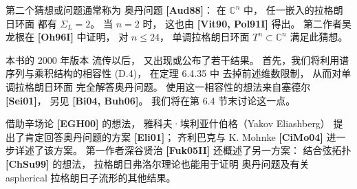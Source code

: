 第二个猜想或问题通常称为
奥丹问题
\textbf{[Aud88]}：
在 $\mathbb C^n$ 中，
任一嵌入的拉格朗日环面
都有 $\Sigma_L=2$。
当 $n=2$ 时，
这也由 \textbf{[Vit90, Pol91I]} 得出。
第二作者吴龙根在
\textbf{[Oh96I]} 中证明，
对 $n\le24$，
单调拉格朗日环面
$T^n\subset\mathbb C^n$
满足此猜想。

本书的 2000 年版本
流传以后，
又出现或公布了若干结果。
首先，我们将利用谱序列与乘积结构的相容性
\textup{(D.4)}，
在定理 6.4.35 中
去掉前述维数限制，
从而对单调拉格朗日环面
完全解答奥丹问题。
使用这一相容性的想法来自塞德尔
\textbf{[Sei01]}，
另见 \textbf{[Bi04, Buh06]}。
我们将在第 6.4 节末讨论这一点。

借助辛场论 \textbf{[EGH00]} 的想法，
雅科夫·埃利亚什伯格（Yakov Eliashberg）
提出了肯定回答奥丹问题的方案
\textbf{[Eli01]}；
齐利巴克与 K. Mohnke
\textbf{[CiMo04]}
进一步详述了该方案。
第一作者深谷贤治
\textbf{[Fuk05II]} 还概述了另一方案：
结合弦拓扑 \textbf{[ChSu99]} 的想法，
拉格朗日弗洛尔理论也能用于证明
奥丹问题及有关
aspherical 拉格朗日子流形的其他结果。
